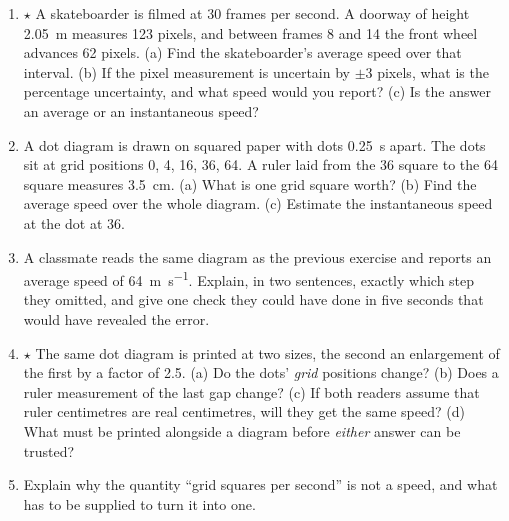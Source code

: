 \documentclass[11pt,twoside,openany]{book}
\newcounter{check}[chapter]
\begin{document}
\begin{enumerate}[label=\textbf{\thechapter.\arabic*},series=exercises,leftmargin=*]
  \item $\star$ A skateboarder is filmed at \num{30} frames per second. A doorway of height \SI{2.05}{\metre} measures \num{123} pixels, and between frames \num{8} and \num{14} the front wheel advances \num{62} pixels. (a) Find the skateboarder's average speed over that interval. (b) If the pixel measurement is uncertain by $\pm\num{3}$ pixels, what is the percentage uncertainty, and what speed would you report? (c) Is the answer an average or an instantaneous speed?\label{ex:skatevideo}
  \item A dot diagram is drawn on squared paper with dots \SI{0.25}{\second} apart. The dots sit at grid positions \num{0}, \num{4}, \num{16}, \num{36}, \num{64}. A ruler laid from the \num{36} square to the \num{64} square measures \SI{3.5}{\centi\metre}. (a) What is one grid square worth? (b) Find the average speed over the whole diagram. (c) Estimate the instantaneous speed at the dot at \num{36}.
  \item A classmate reads the same diagram as the previous exercise and reports an average speed of \SI{64}{\metre\per\second}. Explain, in two sentences, exactly which step they omitted, and give one check they could have done in five seconds that would have revealed the error.
  \item $\star$ The same dot diagram is printed at two sizes, the second an enlargement of the first by a factor of \num{2.5}. (a) Do the dots' \emph{grid} positions change? (b) Does a ruler measurement of the last gap change? (c) If both readers assume that ruler centimetres are real centimetres, will they get the same speed? (d) What must be printed alongside a diagram before \emph{either} answer can be trusted?\label{ex:enlargement}
  \item Explain why the quantity ``grid squares per second'' is not a speed, and what has to be supplied to turn it into one.
\end{enumerate}
\end{document}
